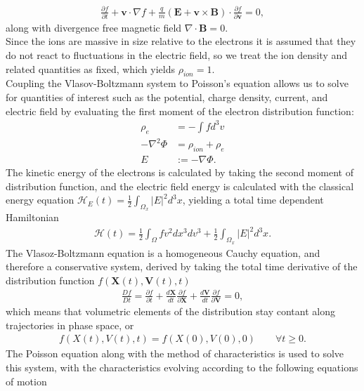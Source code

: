 \documentclass{article}
\begin{document}
\begin{align*}
\frac{\partial f}{\partial t} + \textbf{v}\cdot \nabla f + \frac{q}{m}(\textbf{E} + \textbf{v}\times \textbf{B})\cdot \frac{\partial f}{\partial \textbf{v}}=0,
\end{align*}
along with divergence free magnetic field $\nabla \cdot$\textbf{B}$= 0$.\\
Since the ions are massive in size relative to the electrons it is assumed that they do not react to fluctuations in the electric field, so we treat the ion density and related quantities as fixed, which yields $\rho_{ion} = 1$.\\
\vspace{0.01cm}
Coupling the Vlasov-Boltzmann system to Poisson's equation allows us to solve for quantities of interest such as the potential, charge density, current, and electric field by evaluating the first moment of the electron distribution function: 
\begin{align*}
\rho_{e} &= -\int f d^3v\\
-\nabla^2 \Phi &= \rho_{ion} + \rho_{e}\\
E&:= - \nabla \Phi.
\end{align*}
The kinetic energy of the electrons is calculated by taking the second moment of distribution function, and the electric field energy is calculated with the classical energy equation $\mathcal{H}_E(t) = \frac{1}{2}\int_{\Omega_x} |E|^2 d^3x$, yielding a total time dependent  Hamiltonian
\begin{align*}
\mathcal{H}(t) = \frac{1}{2}\int_{\Omega} f v^2 dx^3dv^3 +  \frac{1}{2}\int_{\Omega_x} |E|^2 d^3x.
\end{align*}
The Vlasoz-Boltzmann equation is a homogeneous Cauchy equation, and therefore a conservative system, derived by taking the total time derivative of the distribution function $f(\textbf{X}(t),\textbf{V}(t),t)$
\begin{align*}
\frac{D f}{Dt} = \frac{\partial f}{\partial t} + \frac{d \textbf{X}}{dt}\frac{\partial f}{\partial \textbf{X}} + \frac{d\textbf{V}}{d t} \frac{\partial f}{\partial \textbf{V}} =0,
\end{align*}
which means that volumetric elements of the distribution stay contant along trajectories in phase space, or
\begin{align*}
f(X(t), V(t), t) =  f(X(0), V(0), 0) \qquad \forall t\ge 0.
\end{align*}
The Poisson equation along with the method of characteristics is used to solve this system, with the characteristics evolving according to the following equations of motion \cite{Ameres}
\end{document}
